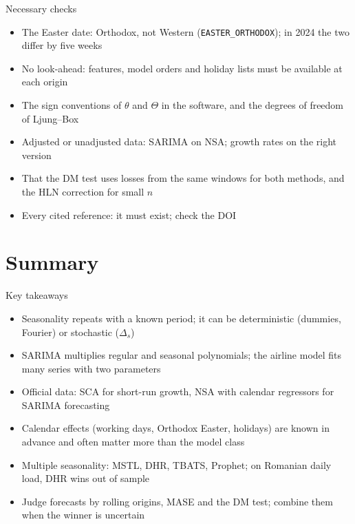 \begin{frame}{Necessary checks}
\itemsize{\small}
\begin{itemize}
    \item The Easter date: Orthodox, not Western (\texttt{EASTER\_ORTHODOX}); in 2024 the two differ by five weeks
    \item No look-ahead: features, model orders and holiday lists must be available at each origin
    \item The sign conventions of $\theta$ and $\Theta$ in the software, and the degrees of freedom of Ljung--Box
    \item Adjusted or unadjusted data: SARIMA on NSA; growth rates on the right version
    \item That the DM test uses losses from the same windows for both methods, and the HLN correction for small $n$
    \item Every cited reference: it must exist; check the DOI
\end{itemize}
\end{frame}


\section{Summary}

\begin{frame}{Key takeaways}
\itemsize{\small}
\begin{itemize}
    \item Seasonality repeats with a known period; it can be deterministic (dummies, Fourier) or stochastic ($\Delta_s$)
    \item SARIMA multiplies regular and seasonal polynomials; the airline model fits many series with two parameters
    \item Official data: SCA for short-run growth, NSA with calendar regressors for SARIMA forecasting
    \item Calendar effects (working days, Orthodox Easter, holidays) are known in advance and often matter more than the model class
    \item Multiple seasonality: MSTL, DHR, TBATS, Prophet; on Romanian daily load, DHR wins out of sample
    \item Judge forecasts by rolling origins, MASE and the DM test; combine them when the winner is uncertain
\end{itemize}
\end{frame}

